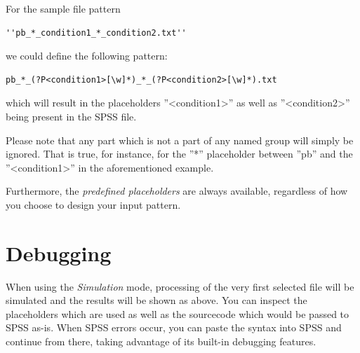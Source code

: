 \documentclass[]{article}
\newcommand{\ph}[1]{{\textless}#1{\textgreater}}
\begin{document}
For the sample file pattern
\begin{verbatim}
''pb_*_condition1_*_condition2.txt''
\end{verbatim}
we could define the following pattern:
\begin{verbatim}
pb_*_(?P<condition1>[\w]*)_*_(?P<condition2>[\w]*).txt
\end{verbatim}
which will result in the placeholders ''\ph{condition1}'' as well as ''\ph{condition2}'' being present in the SPSS file. 

Please note that any part which is not a part of any named group will simply be ignored. That is true, for instance, for the ''*'' placeholder between ''pb'' and the ''\ph{condition1}'' in the aforementioned example. 

Furthermore, the \textit{predefined placeholders} are always available, regardless of how you choose to design your input pattern.


\section{Debugging}
\begin{minipage}{\linewidth}%
\end{minipage}

When using the \textit{Simulation} mode, processing of the very first selected file will be simulated and the results will be shown as above. You can inspect the placeholders which are used as well as the sourcecode which would be passed to SPSS as-is. When SPSS errors occur, you can paste the syntax into SPSS and continue from there, taking advantage of its built-in debugging features. 
\end{document}
